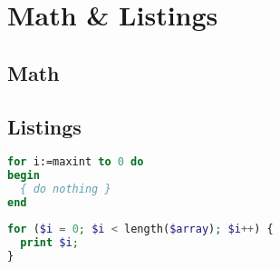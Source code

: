 \section{Math \& Listings}

\subsection{Math}

\subsection{Listings}

\begin{lstlisting}[language=Pascal]
for i:=maxint to 0 do
begin
  { do nothing }
end
\end{lstlisting}

\begin{lstlisting}[language=PHP]
for ($i = 0; $i < length($array); $i++) {
  print $i;
}
\end{lstlisting}
